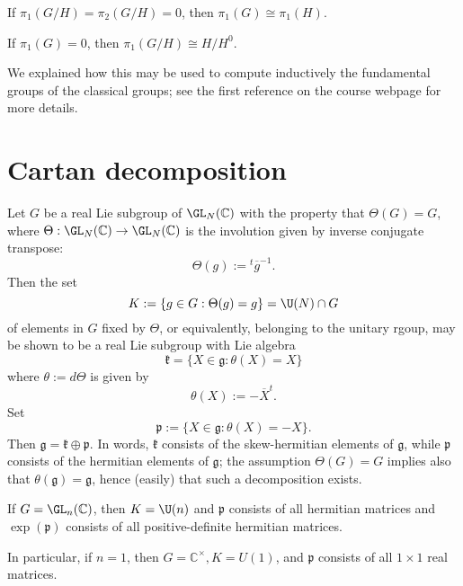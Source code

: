\documentclass[reqno]{amsart} 
\begin{document}
\begin{corollary}
  If $\pi_1(G/H) = \pi_2(G/H) = 0$, then $\pi_1(G) \cong \pi_1(H)$.
\end{corollary}

\begin{corollary}
  If $\pi_1(G) =0$, then $\pi_1(G/H) \cong H/H^0$.
\end{corollary}

We explained how this may be used to compute inductively the fundamental groups of the classical groups; see the first reference on the course webpage for more details.

\section{Cartan decomposition\label{sec:cartan-decmop}}
\label{sec:org167c08b}
Let $G$ be a real Lie subgroup of $\GL_N(\mathbb{C})$ with the property that $\Theta(G) = G$, where $\Theta : \GL_N(\mathbb{C}) \rightarrow \GL_N(\mathbb{C})$ is the involution given by inverse conjugate transpose:
\begin{equation*}
  \Theta(g) := {}^t \overline{g}^{-1}.
\end{equation*}
Then the set
\begin{equation*}
  K := \{g \in G : \Theta(g) = g \} = \U(N) \cap G
\end{equation*}
of elements in $G$ fixed by $\Theta$, or equivalently, belonging to the unitary rgoup, may be shown to be a real Lie subgroup with Lie algebra
\begin{equation*}
  \mathfrak{k} = \{X \in \mathfrak{g} : \theta(X) = X\}
\end{equation*}
where $\theta := d \Theta$ is given by
\begin{equation*}
  \theta(X) := - \overline{X}^t.
\end{equation*}
Set
\begin{equation*}
  \mathfrak{p} := \{X \in \mathfrak{g} : \theta(X) = - X\}.
\end{equation*}
Then $\mathfrak{g} = \mathfrak{k} \oplus \mathfrak{p}$.  In words, $\mathfrak{k}$ consists of the skew-hermitian elements of $\mathfrak{g}$, while $\mathfrak{p}$ consists of the hermitian elements of $\mathfrak{g}$; the assumption $\Theta(G) = G$ implies also that $\theta(\mathfrak{g}) = \mathfrak{g}$, hence (easily) that such a decomposition exists.
\begin{example}\label{example:cartan-decmop-complex-matrices}
  If $G = \GL_n(\mathbb{C})$, then $K = \U(n)$ and $\mathfrak{p}$ consists of all hermitian matrices and $\exp(\mathfrak{p})$ consists of all positive-definite hermitian matrices.

  In particular, if $n =1$, then $G = \mathbb{C}^\times, K = U(1)$, and $\mathfrak{p}$ consists of all $1 \times 1$ real matrices.
\end{example}
\end{document}
